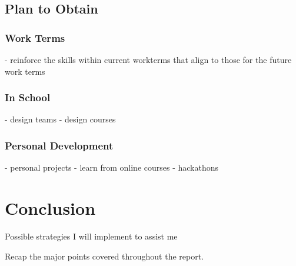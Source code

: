 \documentclass[10pt,letterpaper]{article}
\begin{document}
\subsection{Plan to Obtain}

\subsubsection{Work Terms}
- reinforce the skills within current workterms that align to those for the future work terms

\subsubsection{In School}
- design teams
- design courses

\subsubsection{Personal Development}
- personal projects
- learn from online courses
- hackathons

\clearpage
{}
\section*{Conclusion}\label{conclusion}

Possible strategies I will implement to assist me 

Recap the major points covered throughout the report.\\

\clearpage
{}


\end{document}
